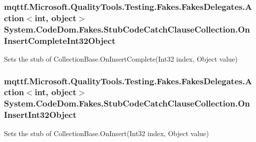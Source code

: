 \hypertarget{class_system_1_1_code_dom_1_1_fakes_1_1_stub_code_catch_clause_collection_a87f0d5fdc080f30d84b9f09fe7f342fa}{
\subsubsection[{On\-Insert\-Complete\-Int32\-Object}]{\setlength{\rightskip}{0pt plus 5cm}mqttf.\-Microsoft.\-Quality\-Tools.\-Testing.\-Fakes.\-Fakes\-Delegates.\-Action$<$int, object$>$ System.\-Code\-Dom.\-Fakes.\-Stub\-Code\-Catch\-Clause\-Collection.\-On\-Insert\-Complete\-Int32\-Object}}\label{class_system_1_1_code_dom_1_1_fakes_1_1_stub_code_catch_clause_collection_a87f0d5fdc080f30d84b9f09fe7f342fa}


Sets the stub of Collection\-Base.\-On\-Insert\-Complete(\-Int32 index, Object value)

\hypertarget{class_system_1_1_code_dom_1_1_fakes_1_1_stub_code_catch_clause_collection_aee2d271d681d9155466f5b578e216d26}{
\subsubsection[{On\-Insert\-Int32\-Object}]{\setlength{\rightskip}{0pt plus 5cm}mqttf.\-Microsoft.\-Quality\-Tools.\-Testing.\-Fakes.\-Fakes\-Delegates.\-Action$<$int, object$>$ System.\-Code\-Dom.\-Fakes.\-Stub\-Code\-Catch\-Clause\-Collection.\-On\-Insert\-Int32\-Object}}\label{class_system_1_1_code_dom_1_1_fakes_1_1_stub_code_catch_clause_collection_aee2d271d681d9155466f5b578e216d26}


Sets the stub of Collection\-Base.\-On\-Insert(\-Int32 index, Object value)


